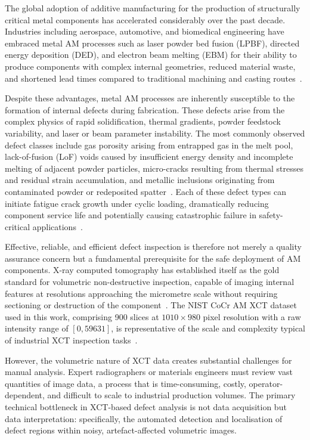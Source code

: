 
The global adoption of additive manufacturing for the production of structurally critical metal
components has accelerated considerably over the past decade. Industries including aerospace,
automotive, and biomedical engineering have embraced metal AM processes such as laser powder bed
fusion (LPBF), directed energy deposition (DED), and electron beam melting (EBM) for their ability to
produce components with complex internal geometries, reduced material waste, and shortened lead
times compared to traditional machining and casting routes~\citep{Deshpande2024}.

Despite these advantages, metal AM processes are inherently susceptible to the formation of internal
defects during fabrication. These defects arise from the complex physics of rapid solidification,
thermal gradients, powder feedstock variability, and laser or beam parameter instability. The most
commonly observed defect classes include gas porosity arising from entrapped gas in the melt pool,
lack-of-fusion (LoF) voids caused by insufficient energy density and incomplete melting of adjacent
powder particles, micro-cracks resulting from thermal stresses and residual strain accumulation, and
metallic inclusions originating from contaminated powder or redeposited spatter~\citep{Zubayer2023}.
Each of these defect types can initiate fatigue crack growth under cyclic loading, dramatically
reducing component service life and potentially causing catastrophic failure in safety-critical
applications~\citep{Liu2024}.

Effective, reliable, and efficient defect inspection is therefore not merely a quality assurance
concern but a fundamental prerequisite for the safe deployment of AM components. X-ray computed
tomography has established itself as the gold standard for volumetric non-destructive inspection,
capable of imaging internal features at resolutions approaching the micrometre scale without
requiring sectioning or destruction of the component~\citep{Miller2020}. The NIST CoCr AM XCT dataset
used in this work, comprising 900 slices at $1010 \times 980$ pixel resolution with a raw intensity
range of $[0, 59631]$, is representative of the scale and complexity typical of industrial XCT
inspection tasks~\citep{NIST_CoCr}.

However, the volumetric nature of XCT data creates substantial challenges for manual analysis. Expert
radiographers or materials engineers must review vast quantities of image data, a process that is
time-consuming, costly, operator-dependent, and difficult to scale to industrial production volumes.
The primary technical bottleneck in XCT-based defect analysis is not data acquisition but data
interpretation: specifically, the automated detection and localisation of defect regions within
noisy, artefact-affected volumetric images.

